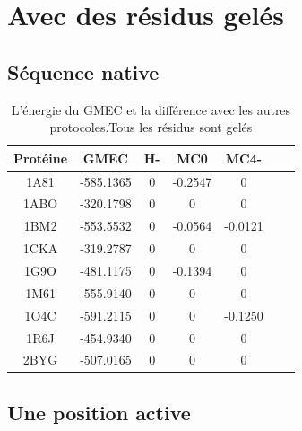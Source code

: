 \documentclass[a4paper,12pt]{article}
\begin{document}
   \section{Avec des résidus gelés}
 
   \subsection{Séquence native}

 
    \begin{table}[h]
      \centering

      \begin{tabular}{|c|c|c|c|c|c|c|}

        \hline
        Protéine & GMEC & H- & MC0 & MC4- \\
        \hline
        1A81 & -585.1365 & 0 & -0.2547 & 0 \\
        1ABO & -320.1798 & 0 & 0 & 0 \\
        1BM2 & -553.5532 & 0 & -0.0564 & -0.0121 \\
        1CKA & -319.2787 & 0 & 0 & 0 \\
        1G9O & -481.1175 & 0 & -0.1394 & 0 \\
        1M61 & -555.9140 & 0 & 0 & 0 \\
        1O4C & -591.2115 & 0 & 0 & -0.1250 \\
        1R6J & -454.9340 & 0 & 0 & 0 \\
        2BYG & -507.0165 & 0 & 0 & 0 \\        
        \hline


      \end{tabular}      
      \caption{L’énergie du GMEC et la différence avec les autres protocoles.Tous les résidus sont gelés}
      \label{tab_best_ener_no_active}      
    \end{table}


   \subsection{ Une position active}
\end{document}
